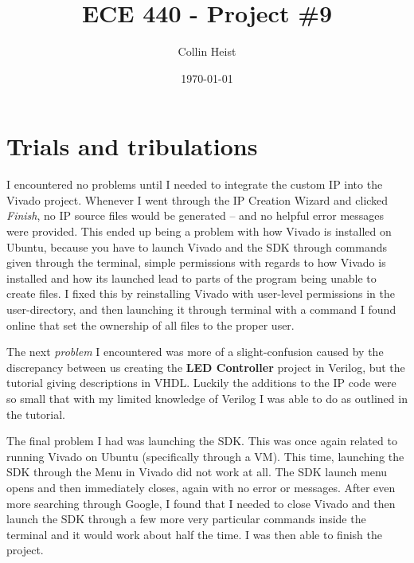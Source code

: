 \documentclass[a4paper, 12pt]{article}
\let\counterwithin\relax
\begin{document}
\counterwithin{lstlisting}{section} %
\title{ECE 440 - Project \#9}
\author{Collin Heist}
\date{\today}
\maketitle


\section{Trials and tribulations}
I encountered no problems until I needed to integrate the custom IP into the Vivado project. Whenever I went through the IP Creation Wizard and clicked \textit{Finish}, no IP source files would be generated -- and no helpful error messages were provided. This ended up being a problem with how Vivado is installed on Ubuntu, because you have to launch Vivado and the SDK through commands given through the terminal, simple permissions with regards to how Vivado is installed and how its launched lead to parts of the program being unable to create files. I fixed this by reinstalling Vivado with user-level permissions in the user-directory, and then launching it through terminal with a command I found online that set the ownership of all files to the proper user.

The next \textit{problem} I encountered was more of a slight-confusion caused by the discrepancy between us creating the \textbf{LED Controller} project in Verilog, but the tutorial giving descriptions in VHDL. Luckily the additions to the IP code were so small that with my limited knowledge of Verilog I was able to do as outlined in the tutorial.

The final problem I had was launching the SDK. This was once again related to running Vivado on Ubuntu (specifically through a VM). This time, launching the SDK through the Menu in Vivado did not work at all. The SDK launch menu opens and then immediately closes, again with no error or messages. After even more searching through Google, I found that I needed to close Vivado and then launch the SDK through a few more very particular commands inside the terminal and it would work about half the time. I was then able to finish the project.
\end{document}
